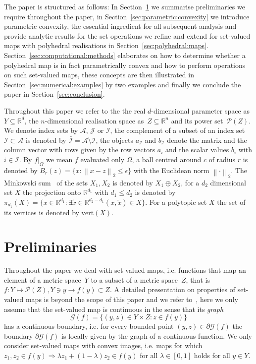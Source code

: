 \documentclass{elsarticle}
\providecommand{\norm}[1]{\left\|#1\right\|}
\theoremstyle{remark}
\theoremstyle{definition}
\begin{document}
The paper is structured as follows:
%
In Section~\ref{sec:preliminaries} we summarise preliminaries we require throughout the paper, in Section~\ref{sec:parametric:convexity} we introduce parametric convexity, the essential ingredient for all subsequent analysis and provide analytic results for the set operations we refine and extend for set-valued maps with polyhedral realisations in Section~\ref{sec:polyhedral:maps}.
%
Section~\ref{sec:computational:methods} elaborates on how to determine whether a polyhedral map is in fact parametrically convex and how to perform operations on such set-valued maps, these concepts are then illustrated in Section~\ref{sec:numerical:examples} by two examples and finally we conclude the paper in Section~\ref{sec:conclusion}.


Throughout this paper we refer to the the real $d$-dimensional parameter space as $Y\subseteq\mathbb R^d$, the $n$-dimensional realisation space as~$Z\subseteq\mathbb R^n$ and its power set~$\mathscr P(Z)$.
%
We denote index sets by $\mathcal A,\,\mathcal J$ or $\mathcal I$, the complement of a subset of an index set $\mathcal I\subset\mathcal A$ is denoted by $\bar{\mathcal I}=\mathcal A\setminus\mathcal I$, the objects $a_{\mathcal I}$ and $b_{\mathcal I}$ denote the matrix and the column vector with rows given by the row vectors $a_i$ and the scalar values $b_i$ with $i\in\mathcal I$.
%
By $f\vert_\Omega$ we mean $f$ evaluated only $\Omega$, a ball centred around $c$ of radius $r$ is denoted by $B_r(z)=\{x:\norm{x-z}_2\leq\epsilon\}$ with the Euclidean norm $\norm{\cdot}_2$.
%
The Minkowski sum~\cite{Minkowski:1911} of the sets $X_1,X_2$ is denoted by $X_1\oplus X_2$, for a $d_2$ dimensional set $X$ the projection onto $\mathbb R^{d_1}$ with $d_1\leq d_2$ is denoted by $\pi_{d_1}(X) = \{x\in\mathbb R^{d_1}:\exists \tilde x\in\mathbb R^{d_2-d_1} (x,\tilde x)\in X\}$.
%
For a polytopic set $X$ the set of its vertices is denoted by $\text{vert}(X)$.
%
\section{Preliminaries}\label{sec:preliminaries}

Throughout the paper we deal with set-valued maps, i.e. functions that map an element of a metric space~$Y$ to a subset of a metric space~$Z$, that is $f:Y\mapsto\mathscr P(Z), Y\ni y\rightarrow f(y)\subset Z$. 
%
A detailed presentation on properties of set-valued maps is beyond the scope of this paper and we refer to~\cite{Aubin:2009}, here we only assume that the set-valued map is continuous in the sense that its \emph{graph}
%
\begin{equation}
  \mathscr G(f) = \{(y,z)\in Y\times Z: z\in f(y)\}
\end{equation}
%
has a continuous boundary, i.e. for every bounded point $(y,z)\in\partial\mathscr G(f)$ the boundary $\partial\mathscr G(f)$ is locally given by the graph of a continuous function.
%
We only consider set-valued maps with convex images, i.e. maps for which $z_1,z_2\in f(y)\Rightarrow \lambda z_1+(1-\lambda)z_2\in f(y)$ for all $\lambda\in[0,1]$ holds for all $y\in Y$.
\end{document}
